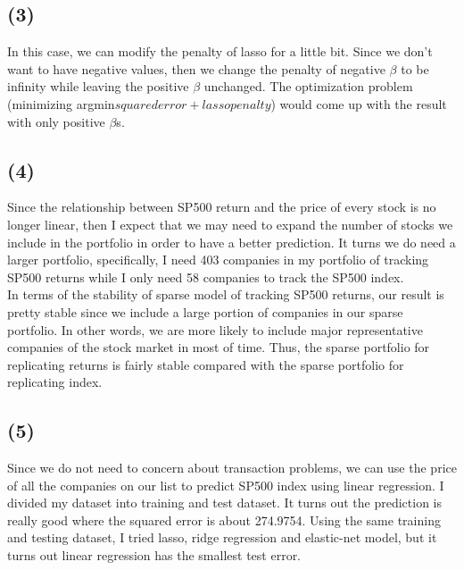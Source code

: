 \documentclass{article}\usepackage[]{graphicx}\usepackage[]{color}
\begin{document}
\subsection*{(3)}
In this case, we can modify the penalty of lasso for a little bit. Since we don't want to have negative values, then we change the penalty of negative $\beta$ to be infinity while leaving the positive $\beta$ unchanged. The optimization problem (minimizing argmin${squared error + lasso penalty}$) would come up with the result with only positive $\beta$s. 

\subsection*{(4)}
Since the relationship between SP500 return and the price of every stock is no longer linear, then I expect that we may need to expand the number of stocks we include in the portfolio in order to have a better prediction. It turns we do need a larger portfolio, specifically, I need 403 companies in my portfolio of tracking SP500 returns while I only need 58 companies to track the SP500 index.\\
In terms of the stability of sparse model of tracking SP500 returns, our result is pretty stable since we include a large portion of companies in our sparse portfolio. In other words, we are more likely to include major representative companies of the stock market in most of time. Thus, the sparse portfolio for replicating returns is fairly stable compared with the sparse portfolio for replicating index.

\subsection*{(5)}
Since we do not need to concern about transaction problems, we can use the price of all the companies on our list to predict SP500 index using linear regression. I divided my dataset into training and test dataset. It turns out the prediction is really good where the squared error is about 274.9754. Using the same training and testing dataset, I tried lasso, ridge regression and elastic-net model, but it turns out linear regression has the smallest test error.
\end{document}
